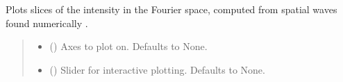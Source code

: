 \documentclass[letterpaper,10pt,english]{sphinxmanual}
\begin{document}
\begin{fulllineitems}
\begin{fulllineitems}
\begin{quote}
\begin{description}
\end{description}\end{quote}

\end{fulllineitems}


\begin{fulllineitems}
\label{\detokenize{source/Box:Box.Box.plot_approximate_intensity_fourier_space_slices}}
\pysigstartsignatures
\pysiglinewithargsret
{}
{\sphinxparamcomma {}}
{}
\pysigstopsignatures
\sphinxAtStartPar
Plots slices of the intensity in the Fourier space, computed from spatial waves found numerically .
\begin{quote}\begin{description}
\begin{itemize}
\item {} 
\sphinxAtStartPar
{} (\sphinxstyleliteralemphasis{\sphinxupquote{, }}) \textendash{} Axes to plot on. Defaults to None.

\item {} 
\sphinxAtStartPar
{} (\sphinxstyleliteralemphasis{\sphinxupquote{, }}) \textendash{} Slider for interactive plotting. Defaults to None.

\end{itemize}

\end{description}\end{quote}

\end{fulllineitems}



\end{fulllineitems}
\end{document}
